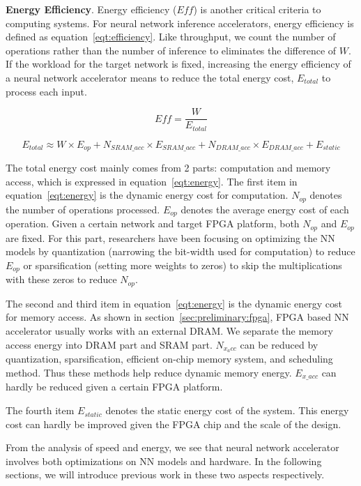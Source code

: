 {\textbf{Energy Efficiency}. Energy efficiency ($Eff$) is another critical criteria to computing systems. For neural network inference accelerators, energy efficiency is defined as equation~\ref{eqt:efficiency}. Like throughput, we count the number of operations rather than the number of inference to eliminates the difference of $W$. If the workload for the target network is fixed, increasing the energy efficiency of a neural network accelerator means to reduce the total energy cost, $E_{total}$ to process each input.

\begin{equation}\label{eqt:efficiency}
    Eff = \frac{W}{E_{total}}
\end{equation}
    
\begin{equation}\label{eqt:energy}
    E_{total} \approx W\times E_{op} + N_{SRAM\_acc}\times E_{SRAM\_acc} + N_{DRAM\_acc}\times E_{DRAM\_acc} + E_{static}
\end{equation}

The total energy cost mainly comes from 2 parts: computation and memory access, which is expressed in equation~\ref{eqt:energy}. The first item in equation~\ref{eqt:energy} is the dynamic energy cost for computation. $N_{op}$ denotes the number of operations processed. $E_{op}$ denotes the average energy cost of each operation. Given a certain network and target FPGA platform, both $N_{op}$ and $E_{op}$ are fixed. For this part, researchers have been focusing on optimizing the NN models by quantization (narrowing the bit-width used for computation) to reduce $E_{op}$ or sparsification (setting more weights to zeros) to skip the multiplications with these zeros to reduce $N_{op}$.

The second and third item in equation~\ref{eqt:energy} is the dynamic energy cost for memory access. As shown in section~\ref{sec:preliminary:fpga}, FPGA based NN accelerator usually works with an external DRAM. We separate the memory access energy into DRAM part and SRAM part. $N_{x_acc}$ can be reduced by quantization, sparsification, efficient on-chip memory system, and scheduling method. Thus these methods help reduce dynamic memory energy. $E_{x\_acc}$ can hardly be reduced given a certain FPGA platform.}

The fourth item $E_{static}$ denotes the static energy cost of the system. This energy cost can hardly be improved given the FPGA chip and the scale of the design.

From the analysis of speed and energy, we see that neural network accelerator involves both optimizations on NN models and hardware. In the following sections, we will introduce previous work in these two aspects respectively.

